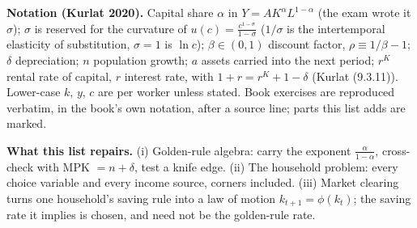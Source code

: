 \documentclass[11pt,a4paper]{article}
\begin{document}
\cabecalho

{\footnotesize\noindent\textbf{Notation (Kurlat 2020).} Capital share $\alpha$ in $Y=AK^\alpha L^{1-\alpha}$ (the exam wrote it
$\sigma$); $\sigma$ is reserved for the curvature of $u(c)=\frac{c^{1-\sigma}}{1-\sigma}$ ($1/\sigma$ is the intertemporal elasticity of substitution,
$\sigma=1$ is $\ln c$); $\beta\in(0,1)$ discount factor, $\rho\equiv1/\beta-1$; $\delta$ depreciation; $n$ population growth; $a$ assets
carried into the next period; $r^K$ rental rate of capital, $r$ interest rate, with $1+r=r^K+1-\delta$ (Kurlat (9.3.11)).
Lower-case $k$, $y$, $c$ are per worker unless stated. Book exercises are reproduced verbatim, in the book's own notation, after a source line; parts this list adds are marked.
\par
\noindent\textbf{What this list repairs.} (i) Golden-rule algebra: carry the exponent $\frac{\alpha}{1-\alpha}$, cross-check with
MPK $=n+\delta$, test a knife edge. (ii) The household problem: every choice variable and every income source, corners included.
(iii) Market clearing turns one household's saving rule into a law of motion $k_{t+1}=\phi(k_t)$; the saving rate it implies is
chosen, and need not be the golden-rule rate.\par}




\end{document}
